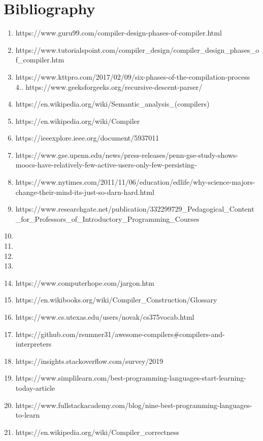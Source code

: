 \documentclass[
]{report}
\providecommand{\tightlist}{%
  \setlength{\itemsep}{0pt}\setlength{\parskip}{0pt}}
\begin{document}
\chapter{Bibliography}
\begin{enumerate}
\def\labelenumi{\arabic{enumi}.}
\tightlist
\item
  https://www.guru99.com/compiler-design-phases-of-compiler.html
\item
  https://www.tutorialspoint.com/compiler\_design/compiler\_design\_phases\_of\_compiler.htm
\item
  https://www.kttpro.com/2017/02/09/six-phases-of-the-compilation-process
  4.. https://www.geeksforgeeks.org/recursive-descent-parser/
\item
  https://en.wikipedia.org/wiki/Semantic\_analysis\_(compilers)
\item
  https://en.wikipedia.org/wiki/Compiler
\item
  https://ieeexplore.ieee.org/document/5937011
\item
  https://www.gse.upenn.edu/news/press-releases/penn-gse-study-shows-moocs-have-relatively-few-active-users-only-few-persisting-
\item
  https://www.nytimes.com/2011/11/06/education/edlife/why-science-majors-change-their-mind-its-just-so-darn-hard.html
\item
  https://www.researchgate.net/publication/332299729\_Pedagogical\_Content\_for\_Professors\_of\_Introductory\_Programming\_Courses
\item
\item
\item
\item
\item
  https://www.computerhope.com/jargon.htm
\item
  https://en.wikibooks.org/wiki/Compiler\_Construction/Glossary
\item
  https://www.cs.utexas.edu/users/novak/cs375vocab.html
\item
  https://github.com/rsumner31/awesome-compilers\#compilers-and-interpreters
\item
  https://insights.stackoverflow.com/survey/2019
\item
  https://www.simplilearn.com/best-programming-languages-start-learning-today-article
\item
  https://www.fullstackacademy.com/blog/nine-best-programming-languages-to-learn
\item
  https://en.wikipedia.org/wiki/Compiler\_correctness
\end{enumerate}
\end{document}
